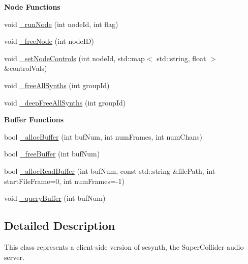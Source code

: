 \begin{Indent}{\bf Node Functions}
\begin{DoxyCompactItemize}
\item 
void \hyperlink{classColliderPlusPlus_1_1Client__Server_a6a7d155ca004a6a26409517a3f762aee}{\-\_\-run\-Node} (int node\-Id, int flag)
\item 
void \hyperlink{classColliderPlusPlus_1_1Client__Server_ad8d8e91efa40eb11edfdca802a82ec9a}{\-\_\-free\-Node} (int node\-I\-D)
\item 
void \hyperlink{classColliderPlusPlus_1_1Client__Server_a54cbee6b8ac056f77d0df2e77d79d260}{\-\_\-set\-Node\-Controls} (int node\-Id, std\-::map$<$ std\-::string, float $>$ \&control\-Vals)
\item 
void \hyperlink{classColliderPlusPlus_1_1Client__Server_a05ffd0269ebcebeabe211a5406782544}{\-\_\-free\-All\-Synths} (int group\-Id)
\item 
void \hyperlink{classColliderPlusPlus_1_1Client__Server_a12c0bde46f4660bf12a22e2262183c53}{\-\_\-deep\-Free\-All\-Synths} (int group\-Id)
\end{DoxyCompactItemize}
\end{Indent}
\begin{Indent}{\bf Buffer Functions}\par
\begin{DoxyCompactItemize}
\item 
bool \hyperlink{classColliderPlusPlus_1_1Client__Server_ad8a85d8a8f25f1f1b0133078dbd4c4d3}{\-\_\-alloc\-Buffer} (int buf\-Num, int num\-Frames, int num\-Chans)
\item 
bool \hyperlink{classColliderPlusPlus_1_1Client__Server_a5dd10ce383bba35133c7057dee000170}{\-\_\-free\-Buffer} (int buf\-Num)
\item 
bool \hyperlink{classColliderPlusPlus_1_1Client__Server_a293596d6659f4b6bfb5d46e2b310cfa2}{\-\_\-alloc\-Read\-Buffer} (int buf\-Num, const std\-::string \&file\-Path, int start\-File\-Frame=0, int num\-Frames=-\/1)
\item 
void \hyperlink{classColliderPlusPlus_1_1Client__Server_ad4f4ff49145681381f451ba91a6c07e2}{\-\_\-query\-Buffer} (int buf\-Num)
\end{DoxyCompactItemize}
\end{Indent}


\subsection{Detailed Description}
This class represents a client-\/side version of scsynth, the Super\-Collider audio server. 

